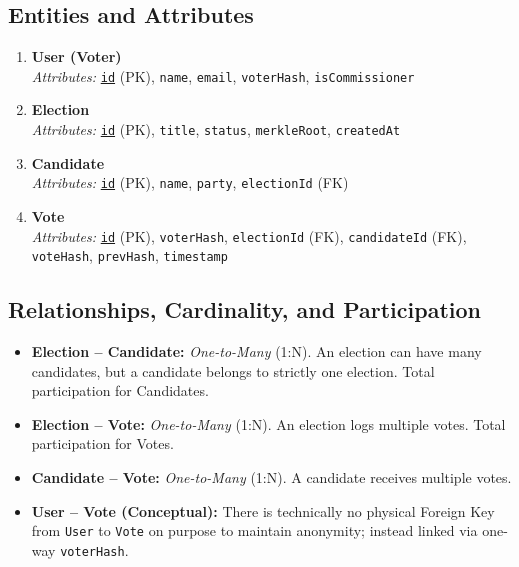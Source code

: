 \documentclass[12pt, a4paper]{article}
\begin{document}
\subsection{Entities and Attributes}
\begin{enumerate}
    \item \textbf{User (Voter)} \\
    \textit{Attributes:} \underline{\texttt{id}} (PK), \texttt{name}, \texttt{email}, \texttt{voterHash}, \texttt{isCommissioner}

    \item \textbf{Election} \\
    \textit{Attributes:} \underline{\texttt{id}} (PK), \texttt{title}, \texttt{status}, \texttt{merkleRoot}, \texttt{createdAt}

    \item \textbf{Candidate} \\
    \textit{Attributes:} \underline{\texttt{id}} (PK), \texttt{name}, \texttt{party}, \texttt{electionId} (FK)

    \item \textbf{Vote} \\
    \textit{Attributes:} \underline{\texttt{id}} (PK), \texttt{voterHash}, \texttt{electionId} (FK), \texttt{candidateId} (FK), \texttt{voteHash}, \texttt{prevHash}, \texttt{timestamp}
\end{enumerate}

\subsection{Relationships, Cardinality, and Participation}
\begin{itemize}
    \item \textbf{Election -- Candidate:} \textit{One-to-Many} (1:N). An election can have many candidates, but a candidate belongs to strictly one election. Total participation for Candidates.
    \item \textbf{Election -- Vote:} \textit{One-to-Many} (1:N). An election logs multiple votes. Total participation for Votes.
    \item \textbf{Candidate -- Vote:} \textit{One-to-Many} (1:N). A candidate receives multiple votes.
    \item \textbf{User -- Vote (Conceptual):} There is technically no physical Foreign Key from \texttt{User} to \texttt{Vote} on purpose to maintain anonymity; instead linked via one-way \texttt{voterHash}.
\end{itemize}
\end{document}

